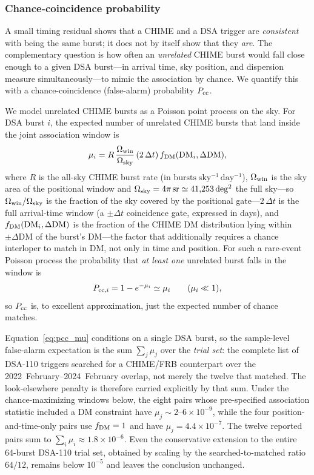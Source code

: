 \subsubsection{Chance-coincidence probability}
\label{sec:toa-pcc}

A small timing residual shows that a CHIME and a DSA trigger are \emph{consistent}
with being the same burst; it does not by itself show that they \emph{are}. The
complementary question is how often an \emph{unrelated} CHIME burst would fall
close enough to a given DSA burst---in arrival time, sky position, and dispersion
measure simultaneously---to mimic the association by chance. We quantify this with
a chance-coincidence (false-alarm) probability $P_{\rm cc}$.

We model unrelated CHIME bursts as a Poisson point process on the sky. For DSA
burst $i$, the expected number of unrelated CHIME bursts that land inside the joint
association window is
\begin{equation}
\mu_i = R \,\frac{\Omega_{\rm win}}{\Omega_{\rm sky}}\, (2\,\Delta t)\, f_{\rm DM}(\mathrm{DM}_i,\Delta\mathrm{DM}),
\label{eq:pcc_mu}
\end{equation}
where $R$ is the all-sky CHIME burst rate (in
$\mathrm{bursts\;sky^{-1}\,day^{-1}}$),
$\Omega_{\rm win}$ is the sky area of the positional window and
$\Omega_{\rm sky} = 4\pi\,\mathrm{sr} \simeq 41{,}253\,\mathrm{deg^2}$ the full
sky---so $\Omega_{\rm win}/\Omega_{\rm sky}$ is the fraction of the sky covered
by the positional gate---$2\,\Delta t$ is the
full arrival-time window (a $\pm\Delta t$ coincidence gate, expressed in days), and
$f_{\rm DM}(\mathrm{DM}_i,\Delta\mathrm{DM})$ is the fraction of the CHIME DM
distribution lying within $\pm\Delta\mathrm{DM}$ of the burst's DM---the factor
that additionally requires a chance interloper to match in DM, not only in
time and position. For such a rare-event Poisson process the probability that
\emph{at least one} unrelated burst falls in the window is
\begin{equation}
P_{{\rm cc},i} = 1 - e^{-\mu_i} \simeq \mu_i \qquad (\mu_i \ll 1),
\label{eq:pcc_p}
\end{equation}
so $P_{\rm cc}$ is, to excellent approximation, just the expected number of chance
matches.

Equation~\eqref{eq:pcc_mu} conditions on a single DSA burst, so the sample-level
false-alarm expectation is the sum $\sum_j \mu_j$ over the \emph{trial set}: the
complete list of DSA-110 triggers searched for a CHIME/FRB counterpart over the
2022~February--2024~February overlap, not merely the twelve that matched. The
look-elsewhere penalty is therefore carried explicitly by that sum. Under the
chance-maximizing windows below, the eight pairs whose pre-specified
association statistic included a DM constraint have
$\mu_j\sim2$--$6\times10^{-9}$, while the four position-and-time-only pairs use
$f_{\rm DM}=1$ and have $\mu_j=4.4\times10^{-7}$. The twelve reported pairs sum
to $\sum_i\mu_i\approx1.8\times10^{-6}$. Even the conservative extension to the
entire 64-burst DSA-110 trial set, obtained by scaling by the searched-to-matched
ratio $64/12$, remains below $10^{-5}$ and leaves the conclusion unchanged.

